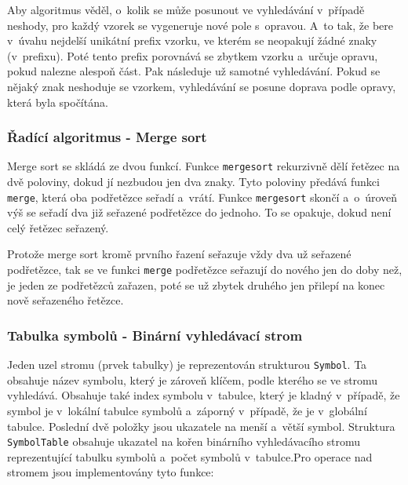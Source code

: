 \documentclass[12pt,a4paper,titlepage,final]{article}
\begin{document}
Aby algoritmus věděl, o~kolik se může posunout ve vyhledávání v~případě neshody, 
pro každý vzorek se vygeneruje nové pole s~opravou. A~to tak, že bere v~úvahu 
nejdelší unikátní prefix vzorku, ve kterém se neopakují žádné znaky (v~prefixu). 
Poté tento prefix porovnává se zbytkem vzorku a~určuje opravu, pokud nalezne alespoň část. 
Pak následuje už samotné vyhledávání. Pokud se nějaký znak neshoduje se vzorkem, 
vyhledávání se posune doprava podle opravy, která byla spočítána.

\subsubsection{Řadící algoritmus - Merge sort}
Merge sort se skládá ze dvou funkcí. Funkce \texttt{mergesort} rekurzivně dělí 
řetězec na dvě poloviny, dokud jí nezbudou jen dva znaky. Tyto poloviny předává funkci 
\texttt{merge}, která oba podřetězce seřadí a~vrátí. Funkce \texttt{mergesort} skončí 
a~o~úroveň výš se seřadí dva již seřazené podřetězce do jednoho. To se opakuje, dokud 
není celý řetězec seřazený.

Protože merge sort kromě prvního řazení seřazuje vždy dva už seřazené podřetězce, 
tak se ve funkci \texttt{merge} podřetězce seřazují do nového jen do doby než, 
je jeden ze podřetězců zařazen, poté se už zbytek druhého jen přilepí na konec nově 
seřazeného řetězce.

\subsubsection{Tabulka symbolů - Binární vyhledávací strom}
Jeden uzel stromu (prvek tabulky) je reprezentován strukturou \texttt{Symbol}. 
Ta obsahuje název symbolu, který je zároveň klíčem, podle kterého se ve stromu vyhledává. 
Obsahuje také index symbolu v~tabulce, který je kladný v~případě, že symbol je 
v~lokální tabulce symbolů a~záporný v~případě, že je v~globální tabulce. Poslední dvě 
položky jsou ukazatele na menší a~větší symbol. Struktura \texttt{SymbolTable} obsahuje 
ukazatel na kořen binárního vyhledávacího stromu reprezentující tabulku symbolů a~počet 
symbolů v~tabulce.\newline\newline\newpage Pro operace nad stromem jsou implementovány tyto funkce:
\medskip
\end{document}
